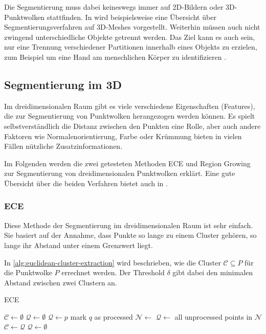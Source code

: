 Die Segmentierung muss dabei keineswegs immer auf 2D-Bildern oder 3D-Punktwolken stattfinden.
In \cite{shamir2008survey} wird beispielsweise eine Übersicht über Segmentierungsverfahren auf 3D-Meshes vorgestellt.
Weiterhin müssen auch nicht zwingend unterschiedliche Objekte getrennt werden.
Das Ziel kann es auch sein, nur eine Trennung verschiedener Partitionen innerhalb eines Objekts zu erzielen, zum Beispiel um eine Hand am menschlichen Körper zu identifizieren \cite{shapira2008consistent}.


\subsection{Segmentierung im 3D}
\label{subsec:3d-segmentation}

Im dreidimensionalen Raum gibt es viele verschiedene Eigenschaften (Features), die zur Segmentierung von Punktwolken herangezogen werden können.
Es spielt selbstverständlich die Distanz zwischen den Punkten eine Rolle, aber auch andere Faktoren wie Normalenorientierung, Farbe oder Krümmung bieten in vielen Fällen nützliche Zusatzinformationen.

Im Folgenden werden die zwei getesteten Methoden \ac{ECE} und Region Growing zur Segmentierung von dreidimensionalen Punktwolken erklärt.
Eine gute Übersicht über die beiden Verfahren bietet auch \citeauthor{RusuDoctoralDissertation} in \cite[88--93]{RusuDoctoralDissertation}.

\subsubsection{\acl{ECE}}
\label{subsubsec:euclidean-cluster-extraction}

Diese Methode der Segmentierung im dreidimensionalen Raum ist sehr einfach.
Sie basiert auf der Annahme, dass Punkte so lange zu einem Cluster gehören, so lange ihr Abstand unter einem Grenzwert liegt.

In \autoref{alg:euclidean-cluster-extraction} wird beschrieben, wie die Cluster $\mathcal{C} \subseteq P$ für die Punktwolke $P$ errechnet werden.
Der Threshold $\delta$ gibt dabei den minimalen Abstand zwischen zwei Clustern an.

\begin{algorithm}
\caption[\acl{ECE}]{\acl{ECE} \cite[89--90]{RusuDoctoralDissertation}}
\label{alg:euclidean-cluster-extraction}
\begin{algorithmic}
\State $\mathcal{C} \gets \emptyset$
\State $\mathcal{Q} \gets \emptyset$
	\State $\mathcal{Q} \gets p$
		\State mark $q$ as processed
		\State $\mathcal{N} \gets$ 
		\State $\mathcal{Q} \gets$ all unprocessed points in $\mathcal{N}$
	\EndFor
	\State $\mathcal{C} \gets \mathcal{Q}$
	\State $\mathcal{Q} \gets \emptyset$
\EndFor
\State {}
\end{algorithmic}
\end{algorithm}

